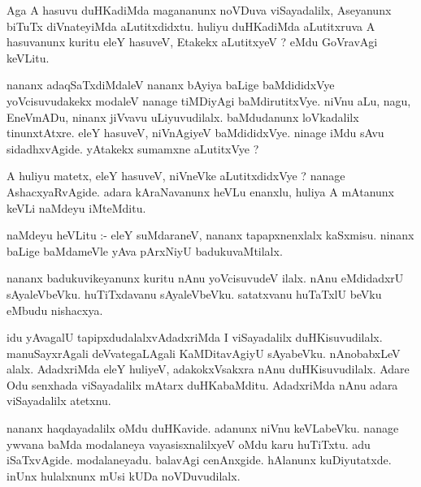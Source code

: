 \documentclass{article}
\begin{document}
\begin{mn}
Aga A hasuvu  duHKadiMda  magananunx  noVDuva  viSayadalilx,  Aseyanunx  biTuTx  
diVnateyiMda  aLutitxdidxtu.  huliyu  duHKadiMda  aLutitxruva  A  hasuvanunx  
kuritu  eleY  hasuveV,  Etakekx  aLutitxyeV ?  eMdu  GoVravAgi   keVLitu.
\end{mn}

\begin{mn}
nananx  adaqSaTxdiMdaleV  nananx  bAyiya  baLige  baMdididxVye  yoVcisuvudakekx  
modaleV  nanage  tiMDiyAgi  baMdirutitxVye.  niVnu  aLu, nagu,  EneVmADu,  
ninanx jiVvavu  uLiyuvudilalx.  baMdudanunx  loVkadalilx  tinunxtAtxre.  eleY  
hasuveV,  niVnAgiyeV  baMdididxVye.  ninage  iMdu  sAvu  sidadhxvAgide.  
yAtakekx  sumamxne  aLutitxVye ?
\end{mn}

\begin{mn}
A huliyu  matetx,  eleY  hasuveV,  niVneVke  aLutitxdidxVye ?  nanage  AshacxyaRvAgide.  
adara  kAraNavanunx  heVLu  enanxlu,  huliya A mAtanunx  keVLi  naMdeyu  iMteMditu.
\end{mn}

\begin{mn}
naMdeyu  heVLitu :- eleY  suMdaraneV,  nananx  tapapxnenxlalx  kaSxmisu.  
ninanx  baLige  baMdameVle  yAva  pArxNiyU  badukuvaMtilalx.
\end{mn}

\begin{mn}
nananx  badukuvikeyanunx  kuritu  nAnu  yoVcisuvudeV  ilalx.  nAnu  eMdidadxrU  
sAyaleVbeVku.  huTiTxdavanu  sAyaleVbeVku.  satatxvanu  huTaTxlU  beVku  eMbudu  nishacxya. 
\end{mn}

\begin{mn}
idu  yAvagalU  tapipxdudalalxvAdadxriMda  I  viSayadalilx  duHKisuvudilalx.  manuSayxrAgali  
deVvategaLAgali  KaMDitavAgiyU  sAyabeVku.  nAnobabxLeV alalx.  AdadxriMda  eleY  huliyeV,  
adakokxVsakxra  nAnu  duHKisuvudilalx.  Adare  Odu  senxhada  viSayadalilx  mAtarx  
duHKabaMditu.  AdadxriMda  nAnu  adara  viSayadalilx  atetxnu.
\end{mn}

\begin{mn}
nananx  haqdayadalilx  oMdu  duHKavide.  adanunx  niVnu  keVLabeVku.  nanage  ywvana  baMda  
modalaneya  vayasisxnalilxyeV  oMdu  karu  huTiTxtu.  adu  iSaTxvAgide.  modalaneyadu.  
balavAgi  cenAnxgide.  hAlanunx  kuDiyutatxde.  inUnx  hulalxnunx  mUsi  kUDa  noVDuvudilalx.
\end{mn}
\end{document}
